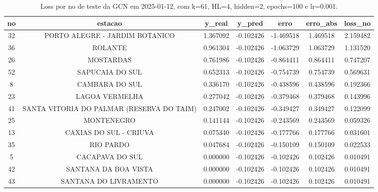 \begin{table}[h]
\centering
\caption{Loss por no de teste da GCN em 2025-01-12, com k=61, HL=4, hidden=2, epochs=100 e lr=0.001.}
\label{tab:gcn_loss_k61_hl4_h2_e100_d20250112}
\begin{tabular}{ccccccc}
\toprule
no & estacao & y\_real & y\_pred & erro & erro\_abs & loss\_no \\
\midrule
32 & PORTO ALEGRE - JARDIM BOTANICO & 1.367092 & -0.102426 & -1.469518 & 1.469518 & 2.159482 \\
36 & ROLANTE & 0.961304 & -0.102426 & -1.063729 & 1.063729 & 1.131520 \\
26 & MOSTARDAS & 0.761986 & -0.102426 & -0.864411 & 0.864411 & 0.747207 \\
52 & SAPUCAIA DO SUL & 0.652313 & -0.102426 & -0.754739 & 0.754739 & 0.569631 \\
8 & CAMBARA DO SUL & 0.336170 & -0.102426 & -0.438596 & 0.438596 & 0.192366 \\
23 & LAGOA VERMELHA & 0.277042 & -0.102426 & -0.379468 & 0.379468 & 0.143996 \\
41 & SANTA VITORIA DO PALMAR (RESERVA DO TAIM) & 0.247002 & -0.102426 & -0.349427 & 0.349427 & 0.122099 \\
25 & MONTENEGRO & 0.141144 & -0.102426 & -0.243569 & 0.243569 & 0.059326 \\
13 & CAXIAS DO SUL - CRIUVA & 0.075340 & -0.102426 & -0.177766 & 0.177766 & 0.031601 \\
35 & RIO PARDO & 0.047684 & -0.102426 & -0.150109 & 0.150109 & 0.022533 \\
5 & CACAPAVA DO SUL & 0.000000 & -0.102426 & -0.102426 & 0.102426 & 0.010491 \\
42 & SANTANA DA BOA VISTA & 0.000000 & -0.102426 & -0.102426 & 0.102426 & 0.010491 \\
43 & SANTANA DO LIVRAMENTO & 0.000000 & -0.102426 & -0.102426 & 0.102426 & 0.010491 \\
\bottomrule
\end{tabular}
\end{table}
